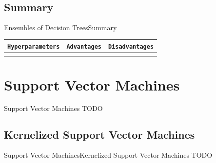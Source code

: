 \documentclass[10pt,compress]{beamer} %
\begin{document}
\subsection{Summary}
\begin{frame}{Ensembles of Decision Trees}{Summary}
	\begin{center}
	\begin{tabular}{cp{3cm}p{3cm}}\hline
	 	\texttt{Hyperparameters}  & \texttt{Advantages}  & \texttt{Disadvantages} \\\hline
	 	                          &                               &   \\
	 	\hline
	\end{tabular}
	\end{center}
\end{frame}

\section{Support Vector Machines}

\begin{frame}{Support Vector Machines}
    TODO
\end{frame}

\subsection{Kernelized Support Vector Machines}
\begin{frame}{Support Vector Machines}{Kernelized Support Vector Machines}
    TODO
\end{frame}
\end{document}
